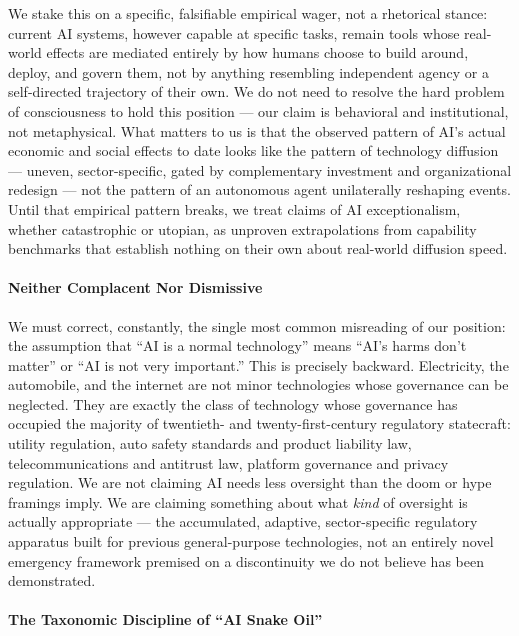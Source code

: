 We stake this on a specific, falsifiable empirical wager, not a
rhetorical stance: current AI systems, however capable at specific
tasks, remain tools whose real-world effects are mediated entirely by
how humans choose to build around, deploy, and govern them, not by
anything resembling independent agency or a self-directed trajectory of
their own. We do not need to resolve the hard problem of consciousness
to hold this position --- our claim is behavioral and institutional, not
metaphysical. What matters to us is that the observed pattern of AI's
actual economic and social effects to date looks like the pattern of
technology diffusion --- uneven, sector-specific, gated by complementary
investment and organizational redesign --- not the pattern of an
autonomous agent unilaterally reshaping events. Until that empirical
pattern breaks, we treat claims of AI exceptionalism, whether
catastrophic or utopian, as unproven extrapolations from capability
benchmarks that establish nothing on their own about real-world
diffusion speed.

\paragraph{Neither Complacent Nor
Dismissive}\label{neither-complacent-nor-dismissive}

We must correct, constantly, the single most common misreading of our
position: the assumption that ``AI is a normal technology'' means ``AI's
harms don't matter'' or ``AI is not very important.'' This is precisely
backward. Electricity, the automobile, and the internet are not minor
technologies whose governance can be neglected. They are exactly the
class of technology whose governance has occupied the majority of
twentieth- and twenty-first-century regulatory statecraft: utility
regulation, auto safety standards and product liability law,
telecommunications and antitrust law, platform governance and privacy
regulation. We are not claiming AI needs less oversight than the doom or
hype framings imply. We are claiming something about what \emph{kind} of
oversight is actually appropriate --- the accumulated, adaptive,
sector-specific regulatory apparatus built for previous general-purpose
technologies, not an entirely novel emergency framework premised on a
discontinuity we do not believe has been demonstrated.

\paragraph{The Taxonomic Discipline of ``AI Snake
Oil''}\label{the-taxonomic-discipline-of-ai-snake-oil}

